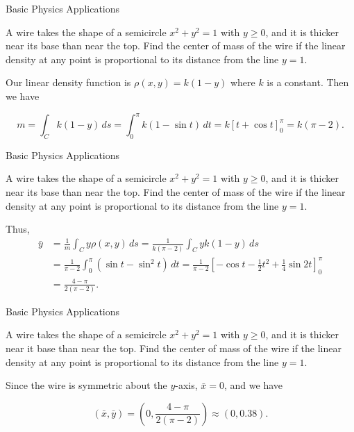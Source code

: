 \documentclass[11pt,english,
handout
]{beamer}
\begin{document}
\begin{frame}[t]{Basic Physics Applications}
\small
\begin{example}
A wire takes the shape of a semicircle  $x^2+y^2=1$ with $y\geq 0$, and it is thicker near its base than near the top. Find the center of mass of the wire if the linear density at any point is proportional to its distance from the line $y=1$.\pause

\lspace
Our linear density function is $\rho(x,y)=k(1-y)$ where $k$ is a constant. \pause Then we have

\[
m=\int_Ck(1-y)\,ds=\int_0^\pi k(1-\sin t)\,dt=k\left[t+\cos t\right]_0^\pi=k(\pi-2).
\]
\end{example}
\end{frame}










\begin{frame}[t]{Basic Physics Applications}
\small
\begin{example}
A wire takes the shape of a semicircle  $x^2+y^2=1$ with $y\geq 0$, and it is thicker near its base than near the top. Find the center of mass of the wire if the linear density at any point is proportional to its distance from the line $y=1$.

\lspace
Thus,
\begin{align*}
\bar{y}&=\frac{1}{m}\int_Cy\rho(x,y)\,ds=\frac{1}{k(\pi-2)}\int_Cyk(1-y)\,ds\\[2mm]
&=\frac{1}{\pi-2}\int_0^\pi(\sin t-\sin^2t)\,dt=\frac{1}{\pi-2}\left[-\cos t-\frac{1}{2}t^2+\frac{1}{4}\sin2t\right]_0^\pi\\[2mm]
&=\frac{4-\pi}{2(\pi-2)}.
\end{align*}
\end{example}
\end{frame}










\begin{frame}[t]{Basic Physics Applications}
\small
\begin{example}
A wire takes the shape of a semicircle  $x^2+y^2=1$ with $y\geq 0$, and it is thicker near it base than near the top. Find the center of mass of the wire if the linear density at any point is proportional to its distance from the line $y=1$.

\lspace
Since the wire is symmetric about the $y$-axis, $\bar{x}=0$, and we have

\[
(\bar{x},\bar{y})=\left(0,\frac{4-\pi}{2(\pi-2)}\right)\approx(0,0.38).
\]
\end{example}
\end{frame}
\end{document}
